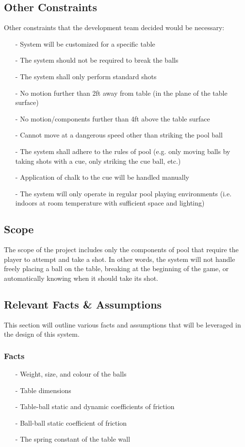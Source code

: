\documentclass[titlepage]{article}
\begin{document}
\subsection{Other Constraints}
Other constraints that the development team decided would be necessary:
\begin{itemize}
	\item[-] System will be customized for a specific table
	\item[-] The system should not be required to break the balls
	\item[-] The system shall only perform standard shots
	\item[-] No motion further than 2ft away from table (in the plane of the table surface)
	\item[-] No motion/components further than 4ft above the table surface
	\item[-] Cannot move at a dangerous speed other than striking the pool ball
	\item[-] The system shall adhere to the rules of pool (e.g. only moving balls by taking shots with a cue, only striking the cue ball, etc.)
	\item[-] Application of chalk to the cue will be handled manually
	\item[-] The system will only operate in regular pool playing environments (i.e. indoors at room temperature with sufficient space and lighting)
\end{itemize}

\subsection{Scope}
The scope of the project includes only the components of pool that require the player to attempt and take a shot. In other words, the system will not handle freely placing a ball on the table, breaking at the beginning of the game, or automatically knowing when it should take its shot.

\subsection{Relevant Facts \& Assumptions}
This section will outline various facts and assumptions that will be leveraged in the design of this system.
\subsubsection{Facts}
\begin{itemize}
	\item[-] Weight, size, and colour of the balls
	\item[-] Table dimensions
	\item[-] Table-ball static and dynamic coefficients of friction
	\item[-] Ball-ball static coefficient of friction
	\item[-] The spring constant of the table wall
\end{itemize}
\end{document}
